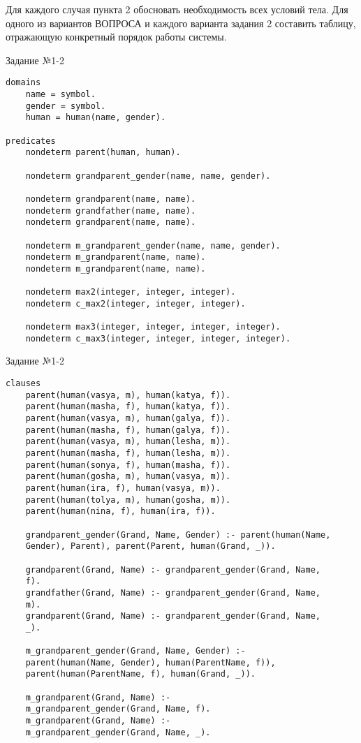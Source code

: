 Для каждого случая пункта 2 обосновать необходимость всех условий тела. Для одного из вариантов ВОПРОСА и каждого варианта задания 2 составить таблицу, отражающую конкретный порядок работы системы.
  
\begin{code}
\caption{Задание №1-2}
\label{code:bf1}
\begin{verbatim}
domains
	name = symbol.
	gender = symbol.
	human = human(name, gender).
	
predicates
	nondeterm parent(human, human).
	
	nondeterm grandparent_gender(name, name, gender).
	
	nondeterm grandparent(name, name).
	nondeterm grandfather(name, name).
	nondeterm grandparent(name, name).
	
	nondeterm m_grandparent_gender(name, name, gender).
	nondeterm m_grandparent(name, name).
	nondeterm m_grandparent(name, name).
	
	nondeterm max2(integer, integer, integer).
	nondeterm c_max2(integer, integer, integer).
	
	nondeterm max3(integer, integer, integer, integer).
	nondeterm c_max3(integer, integer, integer, integer).
\end{verbatim}
\end{code}

\newpage

\begin{code}
\caption{Задание №1-2}
\label{code:bf2}
\begin{verbatim}		
clauses
	parent(human(vasya, m), human(katya, f)).
	parent(human(masha, f), human(katya, f)).
	parent(human(vasya, m), human(galya, f)).
	parent(human(masha, f), human(galya, f)).
	parent(human(vasya, m), human(lesha, m)).
	parent(human(masha, f), human(lesha, m)).		  
	parent(human(sonya, f), human(masha, f)).
	parent(human(gosha, m), human(vasya, m)).
	parent(human(ira, f), human(vasya, m)).
	parent(human(tolya, m), human(gosha, m)).
	parent(human(nina, f), human(ira, f)).
	
	grandparent_gender(Grand, Name, Gender) :- parent(human(Name,
	Gender), Parent), parent(Parent, human(Grand, _)).
	
	grandparent(Grand, Name) :- grandparent_gender(Grand, Name,
	f).
	grandfather(Grand, Name) :- grandparent_gender(Grand, Name, 
	m).
	grandparent(Grand, Name) :- grandparent_gender(Grand, Name, 
	_).
	
	m_grandparent_gender(Grand, Name, Gender) :- 
	parent(human(Name, Gender), human(ParentName, f)), 
	parent(human(ParentName, f), human(Grand, _)).
	
	m_grandparent(Grand, Name) :- 
	m_grandparent_gender(Grand, Name, f).
	m_grandparent(Grand, Name) :- 
	m_grandparent_gender(Grand, Name, _).
\end{verbatim}
\end{code}

